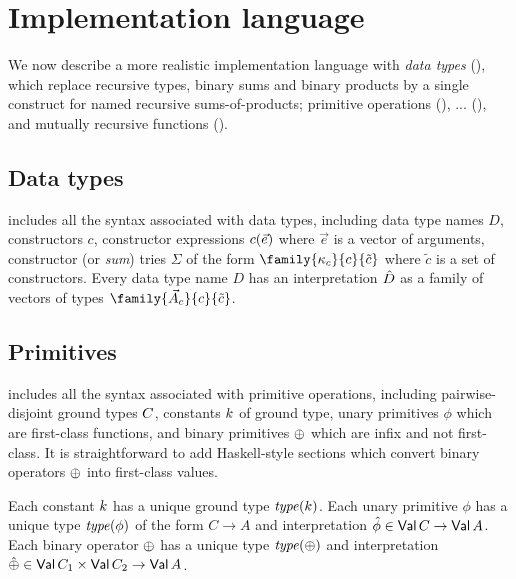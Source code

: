 \section{Implementation language}

We now describe a more realistic implementation language with \emph{data types}
(), which replace recursive types, binary
sums and binary products by a single construct for named recursive
sums-of-products; primitive operations
(), ...
(), and mutually recursive functions
().

\subsection{Data types}
\label{sec:impl-language:data-types}

 includes all the syntax associated with data
types, including data type names $D$, constructors $c$, constructor expressions
$c(\vec{e})$ where $\vec{e}$ is a vector of arguments, constructor
(or \emph{sum}) tries $\Sigma$ of the form $\family{\kappa_c}{c}{\tilde{c}}$
where $\tilde{c}$ is a set of constructors. Every data type name $D$ has an
interpretation $\hat{D}$ as a family of vectors of types
$\family{\vec{A}_c}{c}{\tilde{c}}$.

\subsection{Primitives}
\label{sec:impl-language:primitives}




 includes all the syntax associated with primitive
operations, including pairwise-disjoint ground types $C$, constants
$k$ of ground type, unary primitives $\phi$ which are first-class
functions, and binary primitives $\oplus$ which are infix and not first-class.
It is straightforward to add Haskell-style sections which convert binary
operators $\oplus$ into first-class values.

Each constant $k$ has a unique ground type $\operatorname{\mathit{type}}(k)$.
Each unary primitive $\phi$ has a unique type $\operatorname{\mathit{type}}(\phi)$ of the form $C \to
A$ and interpretation $\hat{\phi} \in \textup{\textsf{Val}}\,C \to \textup{\textsf{Val}}\,A$. Each binary
operator $\oplus$ has a unique type $\operatorname{\mathit{type}}(\oplus)$ and interpretation
$\hat{\oplus} \in \textup{\textsf{Val}}\,C_1 \times \textup{\textsf{Val}}\,C_2 \to \textup{\textsf{Val}}\,A$.

